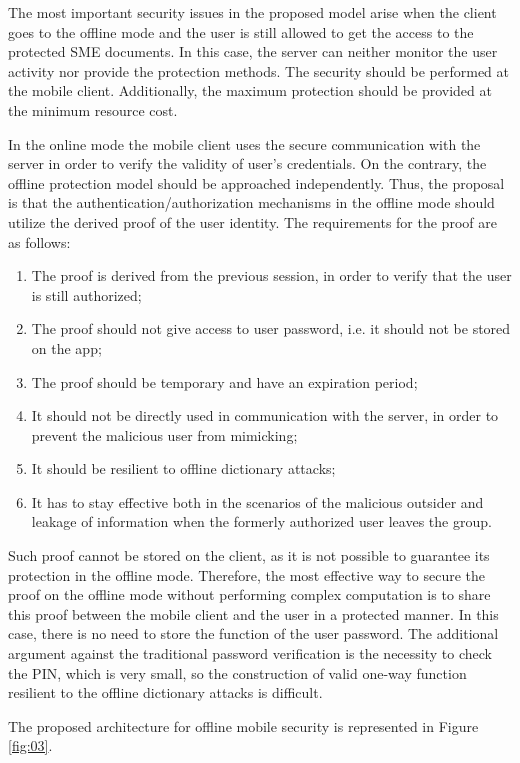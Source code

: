 \documentclass[twocolumn]{svjour3}          	%
\begin{document}
The most important security issues in the proposed model arise when the client goes to the offline mode and the user is still allowed to get the access to the protected SME documents. In this case, the server can neither monitor the user activity nor provide the protection methods. The security should be performed at the mobile client. Additionally, the maximum protection should be provided at the minimum resource cost. 

In the online mode the mobile client uses the secure communication with the server in order to verify the validity of user’s credentials. On the contrary, the offline protection model should be approached independently. Thus, the proposal is that the authentication/authorization mechanisms in the offline mode should utilize the derived proof of the user identity. The requirements for the proof are as follows:

\begin{enumerate}
	\item The proof is derived from the previous session, in order to verify that the user is still authorized;
	\item The proof should not give access to user password, i.e. it should not be stored on the app;
	\item The proof should be temporary and have an expiration period;
	\item It should not be directly used in communication with the server, in order to prevent the malicious user from mimicking;
	\item It should be resilient to offline dictionary attacks;
	\item It has to stay effective both in the scenarios of the malicious outsider and leakage of information when the formerly authorized user leaves the group.
\end{enumerate}

Such proof cannot be stored on the client, as it is not possible to guarantee its protection in the offline mode. Therefore, the most effective way to secure the proof on the offline mode without performing complex computation is to share this proof between the mobile client and the user in a protected manner. In this case, there is no need to store the function of the user password. The additional argument against the traditional password verification is the necessity to check the PIN, which is very small, so the construction of valid one-way function resilient to the offline dictionary attacks is difficult.

The proposed architecture for offline mobile security is represented in Figure \ref{fig:03}.
\end{document}
